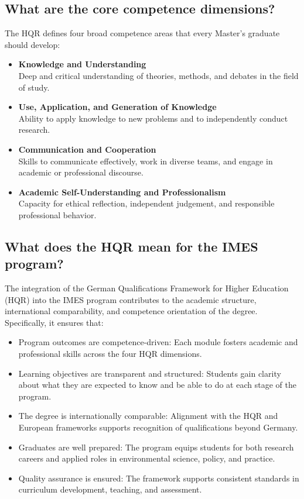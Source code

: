 \documentclass[
  letterpaper,
  10pt,
  openany]{book}
\providecommand{\tightlist}{%
  \setlength{\itemsep}{0pt}\setlength{\parskip}{0pt}}\usepackage{longtable,booktabs,array}
\begin{document}
\subsection*{What are the core competence
dimensions?}\label{what-are-the-core-competence-dimensions}

The HQR defines four broad competence areas that every Master's graduate
should develop:

\begin{itemize}
\item
  \textbf{Knowledge and Understanding}\\
  Deep and critical understanding of theories, methods, and debates in
  the field of study.
\item
  \textbf{Use, Application, and Generation of Knowledge}\\
  Ability to apply knowledge to new problems and to independently
  conduct research.
\item
  \textbf{Communication and Cooperation}\\
  Skills to communicate effectively, work in diverse teams, and engage
  in academic or professional discourse.
\item
  \textbf{Academic Self-Understanding and Professionalism}\\
  Capacity for ethical reflection, independent judgement, and
  responsible professional behavior.
\end{itemize}

\subsection*{What does the HQR mean for the IMES
program?}\label{what-does-the-hqr-mean-for-the-imes-program}

The integration of the German Qualifications Framework for Higher
Education (HQR) into the IMES program contributes to the academic
structure, international comparability, and competence orientation of
the degree. Specifically, it ensures that:

\begin{itemize}
\tightlist
\item
  Program outcomes are competence-driven: Each module fosters academic
  and professional skills across the four HQR dimensions.
\item
  Learning objectives are transparent and structured: Students gain
  clarity about what they are expected to know and be able to do at each
  stage of the program.
\item
  The degree is internationally comparable: Alignment with the HQR and
  European frameworks supports recognition of qualifications beyond
  Germany.
\item
  Graduates are well prepared: The program equips students for both
  research careers and applied roles in environmental science, policy,
  and practice.
\item
  Quality assurance is ensured: The framework supports consistent
  standards in curriculum development, teaching, and assessment.
\end{itemize}
\end{document}
